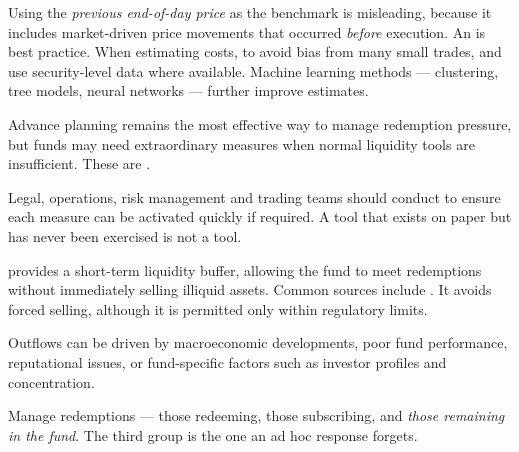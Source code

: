\begin{imtrapbox}[breakable=false,title={Which benchmark, and how to weight}]
Using the \emph{previous end-of-day price} as the benchmark is misleading, because
it includes market-driven price movements that occurred \emph{before} execution.
An  is best practice. When estimating costs,
 to avoid bias from many small trades, and
use security-level data where available. Machine learning methods --- clustering,
tree models, neural networks --- further improve estimates.
\end{imtrapbox}


Advance planning remains the most effective way to manage redemption pressure, but
funds may need extraordinary measures when normal liquidity tools are
insufficient. These are .

\begin{imkeybox}[title={``Break glass'' testing}]
Legal, operations, risk management and trading teams should conduct
 to ensure each measure can be activated quickly if
required. A tool that exists on paper but has never been exercised is not a tool.
\end{imkeybox}

 provides a short-term liquidity buffer, allowing the
fund to meet redemptions without immediately selling illiquid assets. Common
sources include . It avoids forced
selling, although it is permitted only within regulatory limits.


Outflows can be driven by macroeconomic developments, poor fund performance,
reputational issues, or fund-specific factors such as investor profiles and
concentration.

\begin{imkeybox}[title={The main objective}]
Manage redemptions  --- those
redeeming, those subscribing, and \emph{those remaining in the fund}. The third
group is the one an ad hoc response forgets.
\end{imkeybox}

